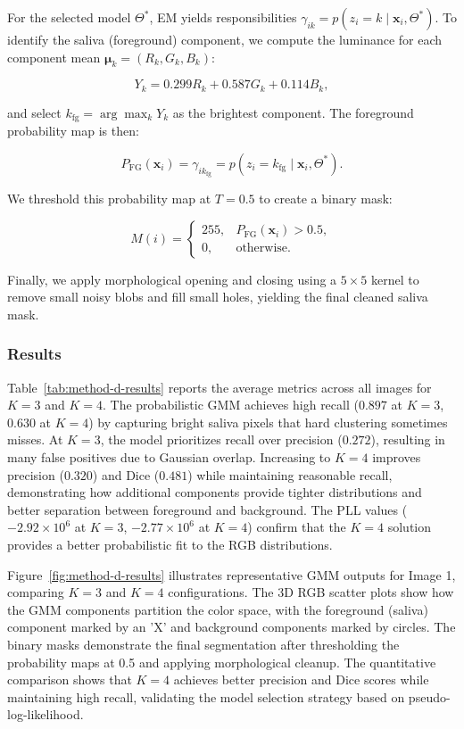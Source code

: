 For the selected model \(\Theta^*\), EM yields responsibilities \(\gamma_{ik} = p(z_i = k \mid \mathbf{x}_i, \Theta^*)\). To identify the saliva (foreground) component, we compute the luminance for each component mean \(\boldsymbol{\mu}_k = (R_k, G_k, B_k)\):

\[
  Y_k = 0.299 R_k + 0.587 G_k + 0.114 B_k,
\]

and select \(k_{\text{fg}} = \arg\max_k Y_k\) as the brightest component. The foreground probability map is then:

\[
  P_{\text{FG}}(\mathbf{x}_i) = \gamma_{ik_{\text{fg}}} = p(z_i = k_{\text{fg}} \mid \mathbf{x}_i, \Theta^*).
\]

We threshold this probability map at \(T = 0.5\) to create a binary mask:

\[
  M(i) = \begin{cases}
    255, & P_{\text{FG}}(\mathbf{x}_i) > 0.5, \\
    0,   & \text{otherwise}.
  \end{cases}
\]

Finally, we apply morphological opening and closing using a \(5 \times 5\) kernel to remove small noisy blobs and fill small holes, yielding the final cleaned saliva mask.

\subsubsection{Results}

Table~\ref{tab:method-d-results} reports the average metrics across all images for \(K=3\) and \(K=4\). The probabilistic GMM achieves high recall (\(0.897\) at \(K=3\), \(0.630\) at \(K=4\)) by capturing bright saliva pixels that hard clustering sometimes misses. At \(K=3\), the model prioritizes recall over precision (\(0.272\)), resulting in many false positives due to Gaussian overlap. Increasing to \(K=4\) improves precision (\(0.320\)) and Dice (\(0.481\)) while maintaining reasonable recall, demonstrating how additional components provide tighter distributions and better separation between foreground and background. The PLL values (\(-2.92 \times 10^6\) at \(K=3\), \(-2.77 \times 10^6\) at \(K=4\)) confirm that the \(K=4\) solution provides a better probabilistic fit to the RGB distributions.

Figure~\ref{fig:method-d-results} illustrates representative GMM outputs for Image 1, comparing \(K=3\) and \(K=4\) configurations. The 3D RGB scatter plots show how the GMM components partition the color space, with the foreground (saliva) component marked by an 'X' and background components marked by circles. The binary masks demonstrate the final segmentation after thresholding the probability maps at 0.5 and applying morphological cleanup. The quantitative comparison shows that \(K=4\) achieves better precision and Dice scores while maintaining high recall, validating the model selection strategy based on pseudo-log-likelihood.

